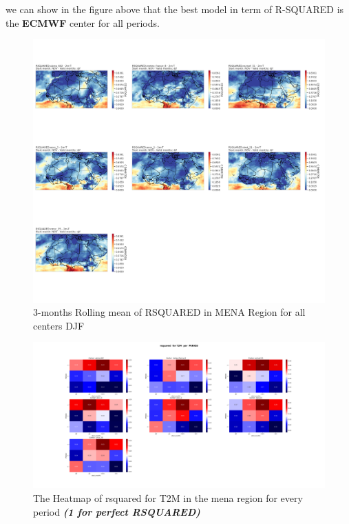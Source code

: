 we can show in the figure above that the best model in term of R-SQUARED is the \textbf{ECMWF} center for all periods.

\begin{figure}[H]
\includegraphics[scale=0.3]{RSQUARED_DJF.png}
\caption{3-months Rolling mean of RSQUARED in MENA Region for all centers DJF}
\end{figure}


\begin{figure}[H]
	\centering
	\includegraphics[scale=0.25]{rsquared_T2M_ PERIOD.png}
	\caption{The Heatmap of rsquared for T2M in the mena region for every period \textbf{\textit{(1 for perfect RSQUARED)} }}

\end{figure}



